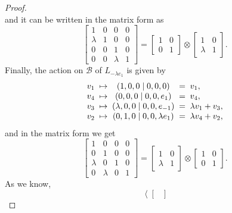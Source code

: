 \begin{proof}
\begin{equation*}
	\end{equation*}
	and it can be written in the matrix form as
	\begin{equation*}
		\begin{bmatrix}
			1 & 0 & 0 & 0 \\
			\lambda & 1 & 0 & 0 \\
			0 & 0 & 1 & 0 \\
			0 & 0 & \lambda & 1
		\end{bmatrix} = 
		\begin{bmatrix}
			1 & 0 \\
			0 & 1
		\end{bmatrix} \otimes
		\begin{bmatrix}
			1 & 0 \\
			\lambda & 1
		\end{bmatrix}.
	\end{equation*}
	Finally, the action on $\mathcal{B}$ of $L_{-\lambda e_1}$ is given by
	\begin{equation*}
		\begin{array}{r@{\;\;}c@{\;\;}c@{\;\;}c@{\;\;}l}
			v_1 & \mapsto & (1,0,0 \mid 0,0,0) & = & v_1, \\
			v_4 & \mapsto & (0,0,0 \mid 0,0,e_1) & = & v_4, \\
			v_3 & \mapsto & (\lambda,0,0 \mid 0,0,e_{-1}) & = & \lambda v_1 + v_3, \\
			v_2 & \mapsto & (0,1,0 \mid 0,0,\lambda e_1) & = & \lambda v_4 + v_2,
		\end{array}
	\end{equation*}
	and in the matrix form we get
	\begin{equation*}
		\begin{bmatrix}
			1 & 0 & 0 & 0 \\
			0 & 1 & 0 & 0 \\
			\lambda & 0 & 1 & 0 \\
			0 & \lambda & 0 & 1
		\end{bmatrix} = 
		\begin{bmatrix}
			1 & 0 \\
			\lambda & 1
		\end{bmatrix} \otimes
		\begin{bmatrix}
			1 & 0 \\
			0 & 1
		\end{bmatrix}.
	\end{equation*}	
	As we know, 
	\begin{equation*}
		\left\langle
			\begin{bmatrix}

\end{bmatrix}
\end{equation*}
\end{proof}
